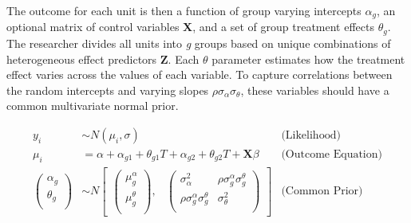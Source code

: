 \documentclass[12pt]{article}
\begin{document}
The outcome for each unit is then a function of group varying intercepts $\alpha_g$, an optional matrix of control variables \textbf{X}, and a set of group treatment effects $\theta_g$.
The researcher divides all units into \textit{g} groups based on unique combinations of heterogeneous effect predictors \textbf{Z}. 
Each $\theta$ parameter estimates how the treatment effect varies across the values of  each variable.  
To capture correlations between the random intercepts and varying slopes $\rho \sigma_\alpha \sigma_\theta$, these variables should have a common multivariate normal prior.


\begin{align*}
y_i &\sim N(\mu_i, \sigma) &\text{(Likelihood)} \\
\mu_i &= \alpha + \alpha_{g1} + \theta_{g1} \textit{T} + \alpha_{g2} + \theta_{g2} \textit{T} + \textbf{X} \beta &\text{(Outcome Equation)}  \\ 
\begin{pmatrix} 
\alpha_{g} \\
\theta_{g} \\
\end{pmatrix} &\sim  N
\begin{bmatrix}
\begin{pmatrix}
\mu^\alpha_{g} \\
\mu^\theta_{g} \\
\end{pmatrix}\!\!,&
\begin{pmatrix}
\sigma^2_\alpha & \rho \sigma^\alpha_{g} \sigma^\theta_{g} \\
\rho \sigma^\alpha_{g} \sigma^\theta_{g} & \sigma^2_\theta \\
\end{pmatrix}
\end{bmatrix} & \text{(Common Prior)} \\ 

\end{align*}
\end{document}

